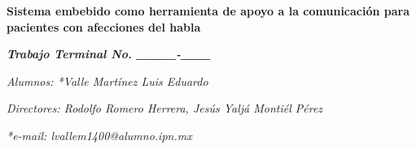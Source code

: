\begin{center}
    \vspace*{1cm}
    
    {\fontsize{14}{16} \textbf{Sistema embebido como herramienta de apoyo a la comunicación para pacientes con afecciones del habla}}
    
    \vspace{0.2cm}
    
    {\fontsize{12}{14} \textbf{\textit{Trabajo Terminal No. \_\_\_\_-\_\_\_}} }
    
    \vspace{0.1cm}
    
    \textit{Alumnos: *Valle Martínez Luis Eduardo}
    
    \vspace{0.1cm}
    
    \textit{Directores: Rodolfo Romero Herrera, Jesús Yaljá Montiél Pérez}
    
    \vspace{0.1cm}
    
    \textit{*e-mail: lvallem1400@alumno.ipn.mx}
    
\end{center}
